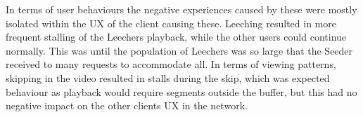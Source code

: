 In terms of user behaviours the negative experiences caused by these were mostly isolated within the \ac{UX} of the client causing these. Leeching resulted in more frequent stalling of the Leechers playback, while the other users could continue normally. This was until the population of Leechers was so large that the Seeder received to many requests to accommodate all. In terms of viewing patterns, skipping in the video resulted in stalls during the skip, which was expected behaviour as playback would require segments outside the buffer, but this had no negative impact on the other clients \ac{UX} in the network.


